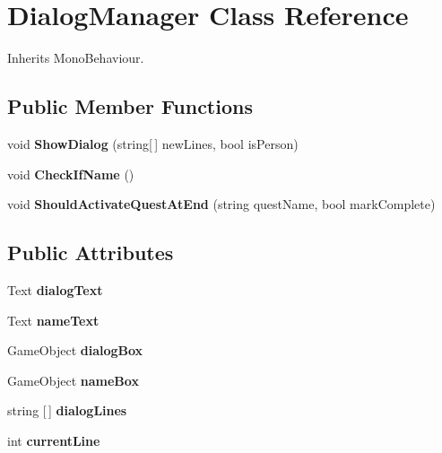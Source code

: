 \hypertarget{class_dialog_manager}{}\section{Dialog\+Manager Class Reference}
\label{class_dialog_manager}


Inherits Mono\+Behaviour.

\subsection*{Public Member Functions}
\begin{DoxyCompactItemize}
\item 
\mbox{\label{class_dialog_manager_adae222dee1c9ec85a7c3d0a8c9dc7534}} 
void {\bfseries Show\+Dialog} (string\mbox{[}$\,$\mbox{]} new\+Lines, bool is\+Person)
\item 
\mbox{\label{class_dialog_manager_a4fe8e6c57a1f0529b76e4fc1cff366e6}} 
void {\bfseries Check\+If\+Name} ()
\item 
\mbox{\label{class_dialog_manager_a8d9b520e6f2262fcde953c7fa57c395a}} 
void {\bfseries Should\+Activate\+Quest\+At\+End} (string quest\+Name, bool mark\+Complete)
\end{DoxyCompactItemize}
\subsection*{Public Attributes}
\begin{DoxyCompactItemize}
\item 
\mbox{\label{class_dialog_manager_ac6d124472a13f60a1bf42aa48904d2f9}} 
Text {\bfseries dialog\+Text}
\item 
\mbox{\label{class_dialog_manager_a6f3507e9dbb221d86e463d104c15cd1b}} 
Text {\bfseries name\+Text}
\item 
\mbox{\label{class_dialog_manager_a9cb8670f0635e9a09a033cb5beeb20cb}} 
Game\+Object {\bfseries dialog\+Box}
\item 
\mbox{\label{class_dialog_manager_a74b4daf2ccb04878ebef49da26d734f2}} 
Game\+Object {\bfseries name\+Box}
\item 
\mbox{\label{class_dialog_manager_a171d20aeaf210e03bd044433f85f9d6a}} 
string \mbox{[}$\,$\mbox{]} {\bfseries dialog\+Lines}
\item 
\mbox{\label{class_dialog_manager_a86a703e1237af750bf79611606115ed4}} 
int {\bfseries current\+Line}
\end{DoxyCompactItemize}
